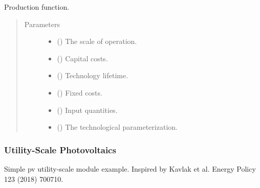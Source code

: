 \documentclass[letterpaper,10pt,english]{sphinxmanual}
\begin{document}
\begin{fulllineitems}
\label{\detokenize{technology:technology.pv_residential_simple.production}}
Production function.
\begin{quote}\begin{description}
\item[{Parameters}] \leavevmode\begin{itemize}
\item {} 
 () \textendash{} The scale of operation.

\item {} 
 () \textendash{} Capital costs.

\item {} 
 () \textendash{} Technology lifetime.

\item {} 
 () \textendash{} Fixed costs.

\item {} 
 () \textendash{} Input quantities.

\item {} 
 () \textendash{} The technological parameterization.

\end{itemize}

\end{description}\end{quote}

\end{fulllineitems}



\subsubsection{Utility-Scale Photovoltaics}
\label{\detokenize{technology:module-technology.utility_pv}}\label{\detokenize{technology:utility-scale-photovoltaics}}
Simple pv utility-scale module example.  Inspired by Kavlak et al. Energy Policy 123 (2018) 700\textendash{}710.
\end{document}
